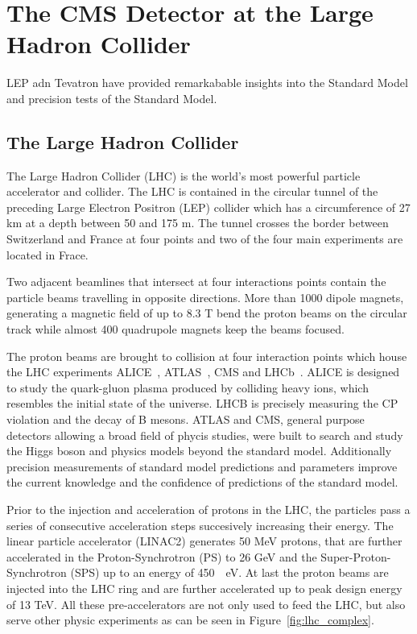 
\chapter{The CMS Detector at the Large Hadron Collider}



LEP adn Tevatron have provided remarkabable insights into the Standard Model and
precision tests of the Standard Model.

\section{The Large Hadron Collider}

The Large Hadron Collider (LHC) is the world's most powerful particle
accelerator and collider. The LHC is contained in the circular tunnel of the
preceding Large Electron Positron (LEP) collider which has a circumference of 27
km at a depth between 50 and 175 m. The tunnel crosses the border between
Switzerland and France at four points and two of the four main experiments are
located in Frace. 

Two adjacent beamlines that intersect at four interactions points contain the
particle beams travelling in opposite directions. More than 1000 dipole magnets,
generating a magnetic field of up to 8.3 T bend the proton beams on the circular track while
almost 400 quadrupole magnets keep the beams focused. 

The proton beams are brought to collision at four interaction points which house
the LHC experiments ALICE~\cite{ALICE}, ATLAS~\cite{ATLASa}, CMS and
LHCb~\cite{LHCb}. ALICE is designed to study the quark-gluon plasma produced by
colliding heavy ions, which resembles the initial state of the universe. LHCB is
precisely measuring the CP violation and the decay of B mesons. ATLAS and CMS,
general purpose detectors allowing a broad field of phycis studies, were built
to search and study the Higgs boson and physics models beyond the standard
model. Additionally precision measurements of standard model predictions and
parameters improve the current knowledge and the confidence of predictions of
the standard model.

Prior to the injection and acceleration of protons in the LHC, the particles
pass a series of consecutive acceleration steps succesively increasing their
energy. The linear particle accelerator (LINAC2) generates 50 MeV protons, that
are further accelerated in the Proton-Synchrotron (PS) to 26 GeV and
the Super-Proton-Synchrotron (SPS) up to an energy of \SI{450}{\giga
\electronvolt}. At last the proton beams are injected into the LHC ring and are
further accelerated up to peak design energy of 13 TeV. All these
pre-accelerators are not only used to feed the LHC, but also serve other physic
experiments as can be seen in Figure~\ref{fig:lhc_complex}.

